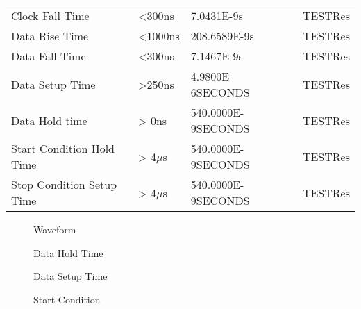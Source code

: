 \documentclass[12pt, a4paper]{article}
\begin{document}
\begin{table}[h]
\begin{tabular}{llll}
Clock Fall Time                 &  \textless{}300ns                  & 7.0431E-9s                                      & TESTRes                      \\
Data Rise Time                  &  \textless{}1000ns                 & 208.6589E-9s                                      & TESTRes                      \\
Data Fall Time                  &  \textless{}300ns                  & 7.1467E-9s                                      & TESTRes                      \\
Data Setup Time                 &  \textgreater{}250ns               & 4.9800E-6SECONDS                                      & TESTRes                      \\
Data Hold time                  &  \textgreater{} 0ns                & 540.0000E-9SECONDS                                      & TESTRes                      \\
Start Condition Hold Time       &  \textgreater{} 4$\mu$s            & 540.0000E-9SECONDS                                      & TESTRes                      \\
Stop Condition Setup Time       &   \textgreater{} 4$\mu$s           & 540.0000E-9SECONDS                                      & TESTRes                      \\  
\end{tabular} 
\end{table} 

\newpage
{}
\begin{figure}\caption{Waveform} \end{figure}
\begin{figure}[h]\caption{Data Hold Time} \end{figure}
\newpage
{}
\begin{figure}\caption{Data Setup Time} \end{figure}
\begin{figure}[h]\caption{Start Condition} \end{figure}
\end{document}
